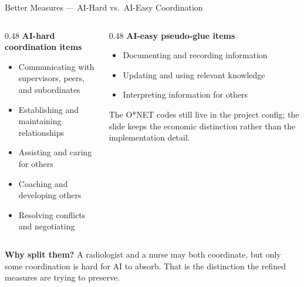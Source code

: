 \documentclass[10pt,english,aspectratio=169]{beamer}
\begin{document}
\begin{frame}{Better Measures --- AI-Hard vs.\ AI-Easy Coordination}
\begin{columns}[T]
\begin{column}{0.48\textwidth}
\textbf{AI-hard coordination items}
\begin{itemize}\scriptsize
  \item Communicating with supervisors, peers, and subordinates
  \item Establishing and maintaining relationships
  \item Assisting and caring for others
  \item Coaching and developing others
  \item Resolving conflicts and negotiating
\end{itemize}
\end{column}
\begin{column}{0.48\textwidth}
\textbf{AI-easy pseudo-glue items}
\begin{itemize}\scriptsize
  \item Documenting and recording information
  \item Updating and using relevant knowledge
  \item Interpreting information for others
\end{itemize}
\vspace{0.1cm}
\scriptsize
The O*NET codes still live in the project config; the slide keeps the economic distinction rather than the implementation detail.
\end{column}
\end{columns}

\vspace{0.12cm}
\begin{tcolorbox}[colback=blue!3,colframe=RedTitle!60]\scriptsize
\textbf{Why split them?} A radiologist and a nurse may both coordinate, but only some coordination is hard for AI to absorb. That is the distinction the refined measures are trying to preserve.
\end{tcolorbox}
\end{frame}
\end{document}

